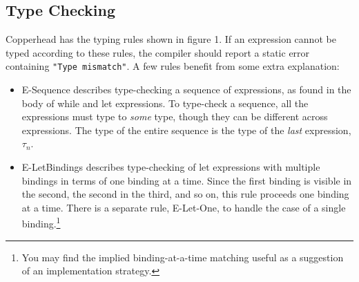 \documentclass[10pt, oneside]{article}
\begin{document}
\subsection*{Type Checking}

Copperhead has the typing rules shown in figure 1. If an expression cannot be
typed according to these rules, the compiler should report a static error
containing \texttt{"Type mismatch"}. A few rules benefit from some extra
explanation:

\begin{itemize}

\item E-Sequence describes type-checking a sequence of expressions, as found
in the body of while and let expressions. To type-check a sequence, all the
expressions must type to \emph{some} type, though they can be different
across expressions. The type of the entire sequence is the type of the
\emph{last} expression, $\tau_n$.

\item E-LetBindings describes type-checking of let expressions with multiple
bindings in terms of one binding at a time. Since the first binding is
visible in the second, the second in the third, and so on, this rule proceeds
one binding at a time. There is a separate rule, E-Let-One, to handle the
case of a single binding.\footnote{You may find the implied binding-at-a-time
matching useful as a suggestion of an implementation strategy.}



\end{itemize}
\end{document}
